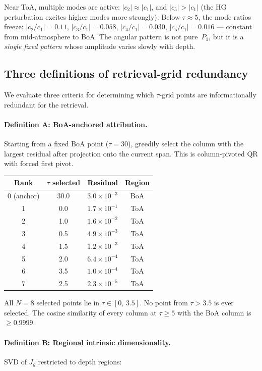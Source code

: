 \documentclass[11pt]{article}
\begin{document}
Near ToA, multiple modes are active: $|c_2|\approx|c_1|$, and
$|c_5| > |c_1|$ (the HG perturbation excites higher modes more
strongly).  Below $\tau\approx 5$, the mode ratios freeze:
$|c_2/c_1| = 0.11$, $|c_3/c_1| = 0.058$, $|c_4/c_1| = 0.030$,
$|c_5/c_1| = 0.016$ --- constant from mid-atmosphere to BoA.
The angular pattern is not pure~$P_1$, but it is a \emph{single
fixed pattern} whose amplitude varies slowly with depth.

\subsection{Three definitions of retrieval-grid redundancy}

We evaluate three criteria for determining which $\tau$-grid
points are informationally redundant for the retrieval.

\paragraph{Definition A: BoA-anchored attribution.}
Starting from a fixed BoA point ($\tau=30$), greedily select the
column with the largest residual after projection onto the
current span.  This is column-pivoted QR with forced first pivot.

\begin{center}
\begin{tabular}{c c c c}
\toprule
Rank & $\tau$ selected & Residual & Region\\
\midrule
0 (anchor) & 30.0 & $3.0\times10^{-3}$ & BoA\\
1 & 0.0  & $1.7\times10^{-1}$ & ToA\\
2 & 1.0  & $1.6\times10^{-2}$ & ToA\\
3 & 0.5  & $4.9\times10^{-3}$ & ToA\\
4 & 1.5  & $1.2\times10^{-3}$ & ToA\\
5 & 2.0  & $6.4\times10^{-4}$ & ToA\\
6 & 3.5  & $1.0\times10^{-4}$ & ToA\\
7 & 2.5  & $2.3\times10^{-5}$ & ToA\\
\bottomrule
\end{tabular}
\end{center}

All $N=8$ selected points lie in $\tau\in[0,\,3.5]$.  No point
from $\tau>3.5$ is ever selected.  The cosine similarity of every
column at $\tau\geq 5$ with the BoA column is $\geq 0.9999$.

\paragraph{Definition B: Regional intrinsic dimensionality.}
SVD of $J_g$ restricted to depth regions:
\end{document}
